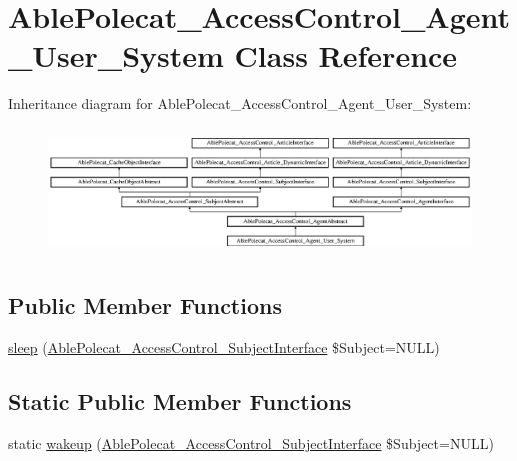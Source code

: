 \hypertarget{class_able_polecat___access_control___agent___user___system}{}\section{Able\+Polecat\+\_\+\+Access\+Control\+\_\+\+Agent\+\_\+\+User\+\_\+\+System Class Reference}
\label{class_able_polecat___access_control___agent___user___system}
Inheritance diagram for Able\+Polecat\+\_\+\+Access\+Control\+\_\+\+Agent\+\_\+\+User\+\_\+\+System\+:\begin{figure}[H]
\begin{center}
\leavevmode
\includegraphics[height=3.414634cm]{class_able_polecat___access_control___agent___user___system}
\end{center}
\end{figure}
\subsection*{Public Member Functions}
\begin{DoxyCompactItemize}
\item 
\hyperlink{class_able_polecat___access_control___agent___user___system_a365e24d7b066205cafa2a5cce3a4f224}{sleep} (\hyperlink{interface_able_polecat___access_control___subject_interface}{Able\+Polecat\+\_\+\+Access\+Control\+\_\+\+Subject\+Interface} \$Subject=N\+U\+L\+L)
\end{DoxyCompactItemize}
\subsection*{Static Public Member Functions}
\begin{DoxyCompactItemize}
\item 
static \hyperlink{class_able_polecat___access_control___agent___user___system_a3f2135f6ad45f51d075657f6d20db2cd}{wakeup} (\hyperlink{interface_able_polecat___access_control___subject_interface}{Able\+Polecat\+\_\+\+Access\+Control\+\_\+\+Subject\+Interface} \$Subject=N\+U\+L\+L)
\end{DoxyCompactItemize}
